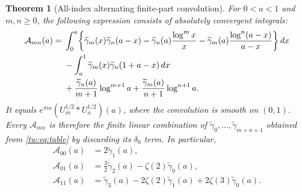 \documentclass[11pt,letterpaper]{article}
\numberwithin{equation}{section}
\theoremstyle{plain}
\newtheorem{theorem}{Theorem}[section]
\theoremstyle{definition}
\theoremstyle{remark}
\begin{document}
\begin{theorem}[All-index alternating finite-part convolution]
\label{tw:thm:alternating}
For $0<a<1$ and $m,n\ge0$, the following expression consists of
absolutely convergent integrals:
\begin{align}
 \mathcal A_{mn}(a)={}&
 \int_0^a\biggl\{
      \widetilde\gamma_m(x)\widetilde\gamma_n(a-x)
       -\widetilde\gamma_n(a)\frac{\log^m x}{x}
       -\widetilde\gamma_m(a)\frac{\log^n(a-x)}{a-x}
                 \biggr\}\,dx\notag\\
 &-\int_a^1\widetilde\gamma_m(x)
                        \widetilde\gamma_n(1+a-x)\,dx\notag\\
 &+\frac{\widetilde\gamma_n(a)}{m+1}\log^{m+1}a
       +\frac{\widetilde\gamma_m(a)}{n+1}\log^{n+1}a.
 \label{tw:eq:Amn}
\end{align}
It equals $e^{\pi ia}(U_m^{1/2}*U_n^{1/2})(a)$, where the
convolution is smooth on $(0,1)$. Every $\mathcal A_{mn}$ is
therefore the finite linear combination of
$\widetilde\gamma_0,\ldots,\widetilde\gamma_{m+n+1}$ obtained
from \eqref{tw:eq:table} by discarding its $\delta_0$ term.
In particular,
\begin{align}
 \mathcal A_{00}(a)&=2\widetilde\gamma_1(a),
       \label{tw:eq:A00}\\
 \mathcal A_{01}(a)&=\tfrac32\widetilde\gamma_2(a)
                          -\zeta(2)\widetilde\gamma_0(a),
       \label{tw:eq:A01}\\
 \mathcal A_{11}(a)&=\widetilde\gamma_3(a)
             -2\zeta(2)\widetilde\gamma_1(a)
             +2\zeta(3)\widetilde\gamma_0(a).
       \label{tw:eq:A11}
\end{align}
\end{theorem}
\end{document}
